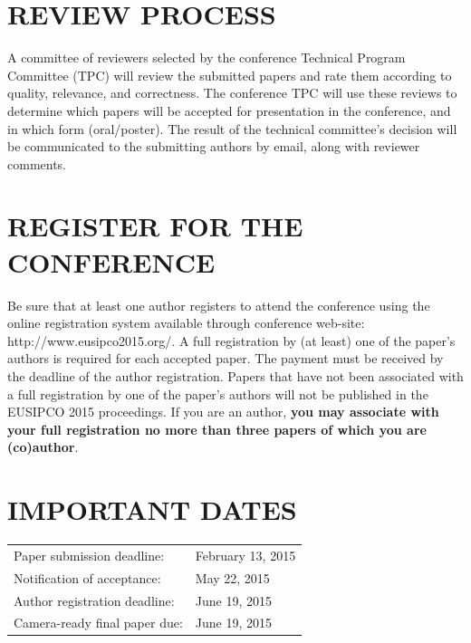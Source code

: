 \documentclass[a4paper]{article}
\begin{document}
\vfill\pagebreak
\section{REVIEW PROCESS}
\label{sec:review}

A committee of reviewers selected by the conference Technical Program Committee (TPC) will review the submitted papers and rate them according to quality, relevance, and correctness. The conference TPC will use these reviews to determine which papers will be accepted for presentation in the conference, and in which form (oral/poster). The result of the technical committee's decision will be communicated to the submitting authors by email, along with reviewer comments.



\section{REGISTER FOR THE CONFERENCE}
\label{sec:reg}
Be sure that at least one author registers to attend the conference using the online registration system available through conference web-site: http://www.eusipco2015.org/. A full registration by (at least) one of the paper's authors is required for each accepted paper. The payment must be received by the deadline of the author registration. Papers that have not been associated with a full registration by one of the paper's authors will not be published in the EUSIPCO 2015 proceedings. If you are an author, \textbf{you may associate with your full registration no more than three papers of which you are (co)author}.


\section{IMPORTANT DATES}
\label{sec:dates}

\begin{center}	
\begin{tabular}{ll}
Paper submission deadline:    & February 13, 2015 \\
Notification of acceptance:   & May 22, 2015   \\
Author registration deadline: & June 19, 2015 \\
Camera-ready final paper due: & June 19, 2015
\end{tabular}
\end{center}



\end{document}
